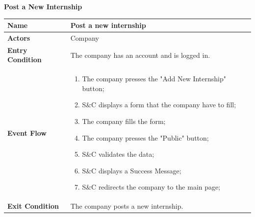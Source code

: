 \begin{enumerate}[label=\textbf{[US\arabic*]}, left = 0pt, align = left, resume]
\begin{longtable}{|l|p{11cm}|}
            \end{longtable}

            \newpage
            \item \textbf{Post a New Internship}
            
            \begin{longtable}{|l|p{11cm}|}  
                \hline
                \textbf{Name} & 
                    \textbf{Post a new internship} \\
                \hline
                
                \textbf{Actors} & 
                    Company \\
                \hline
                
                \textbf{Entry Condition} & 
                    The company has an account and is logged in. \\
                \hline
                
                \textbf{Event Flow} &
                    \begin{enumerate}[label=\arabic*., itemsep=0.2em]
                        \item The company presses the "Add New Internship" button;
                        \item S\&C displays a form that the company have to fill;
                        \item The company fills the form;
                        \item The company presses the "Public" button;
                        \item S\&C validates the data;
                        \item S\&C displays a Success Message;
                        \item S\&C redirects the company to the main page;
                    \end{enumerate} \\
                \hline
                
                \textbf{Exit Condition} & 
                    The company posts a new internship. \\
                \hline
                

\end{longtable}
\end{enumerate}
